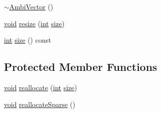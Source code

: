 \begin{DoxyCompactItemize}
\item 
\hyperlink{class_ambi_vector_a582fb2bb891d914d8f7adcaf97716972}{$\sim$\-Ambi\-Vector} ()
\item 
\hyperlink{group___u_a_v_objects_plugin_ga444cf2ff3f0ecbe028adce838d373f5c}{void} \hyperlink{class_ambi_vector_aa055617f92a8d20342e5670caa63337e}{resize} (\hyperlink{ioapi_8h_a787fa3cf048117ba7123753c1e74fcd6}{int} \hyperlink{glext_8h_a014d89bd76f74ef3a29c8f04b473eb76}{size})
\item 
\hyperlink{ioapi_8h_a787fa3cf048117ba7123753c1e74fcd6}{int} \hyperlink{class_ambi_vector_aa0b87fdb324e2931e0d96621851f5258}{size} () const 
\end{DoxyCompactItemize}
\subsection*{Protected Member Functions}
\begin{DoxyCompactItemize}
\item 
\hyperlink{group___u_a_v_objects_plugin_ga444cf2ff3f0ecbe028adce838d373f5c}{void} \hyperlink{class_ambi_vector_ab0e83bd7b03671c625fdd8ce1ae2505c}{reallocate} (\hyperlink{ioapi_8h_a787fa3cf048117ba7123753c1e74fcd6}{int} \hyperlink{glext_8h_a014d89bd76f74ef3a29c8f04b473eb76}{size})
\item 
\hyperlink{group___u_a_v_objects_plugin_ga444cf2ff3f0ecbe028adce838d373f5c}{void} \hyperlink{class_ambi_vector_a8f8a75546c6411d69489916a37ff7c3f}{reallocate\-Sparse} ()
\end{DoxyCompactItemize}
